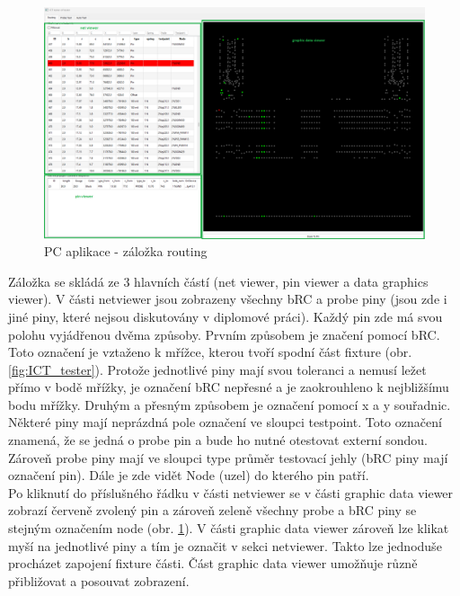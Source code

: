 \begin{figure}[ht!]
    \centering
    \includegraphics[width = 1\textwidth]{obrazky/PC_AP_top_view.png}
    \caption{PC aplikace - záložka routing}
    \label{PC aplikace - záložka routing}
\end{figure}

Záložka se skládá ze 3 hlavních částí (net viewer, pin viewer a data graphics viewer).
V části netviewer jsou zobrazeny všechny bRC a probe piny (jsou zde i jiné piny, které nejsou diskutovány v diplomové práci).
Každý pin zde má svou polohu vyjádřenou dvěma způsoby. Prvním způsobem je značení pomocí bRC. Toto označení je
vztaženo k mřížce, kterou tvoří spodní část fixture (obr. \ref{fig:ICT_tester}). Protože jednotlivé piny mají svou toleranci
a nemusí ležet přímo v bodě mřížky, je označení bRC nepřesné a je zaokrouhleno k nejbližšímu bodu mřížky.
Druhým a přesným způsobem je označení pomocí x a y souřadnic.\\

Některé piny mají neprázdná pole označení ve sloupci testpoint.
Toto označení znamená, že se jedná o probe pin a bude ho nutné otestovat externí sondou. Zároveň probe piny
mají ve sloupci type průměr testovací jehly (bRC piny mají označení pin). Dále je zde vidět Node (uzel) do kterého pin patří.\\

Po kliknutí do příslušného řádku v části netviewer se v části graphic data viewer zobrazí červeně zvolený pin
a zároveň zeleně všechny probe a bRC piny se stejným označením node (obr. \ref{PC aplikace - záložka routing}).
V části graphic data viewer zároveň lze klikat myší na jednotlivé piny a tím je označit v sekci netviewer.
Takto lze jednoduše procházet zapojení fixture části. Část graphic data viewer umožňuje různě přibližovat a posouvat
zobrazení.\\

